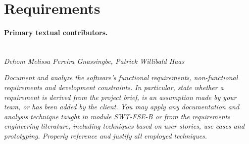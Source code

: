 \section{Requirements}
\label{sec:requirements}

\paragraph{Primary textual contributors.}
\mbox{}\\\emph{Dehom Melissa Pereira Gnassingbe, Patrick Willibald Haas}

\emph{Document and analyze the software's functional requirements, 
non-functional requirements and development constraints. In particular, state 
whether a requirement is derived from the project brief, is an assumption made 
by your team, or has been added by the client. You may apply any documentation 
and analysis technique taught in module SWT-FSE-B or from the requirements 
engineering literature, including techniques based on user stories, use cases 
and prototyping. Properly reference and justify all employed techniques.}


